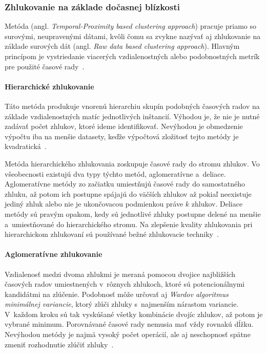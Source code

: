 \documentclass[a4paper,twoside,slovak,12pt,appendix]{article}
\begin{document}
\subsubsection{Zhlukovanie na základe dočasnej blízkosti}
Metóda (angl. \textit{Temporal-Proximity based clustering approach}) pracuje
priamo so surovými, neupravenými dátami, kvôli čomu sa zvykne nazývať aj
zhlukovanie na základe surových dát (angl. \textit{Raw data based clustering
approach}). Hlavným princípom je vystriedanie viacerých vzdialenostných alebo
podobnostných metrík pre použité časové rady~\cite{Rani2012}.

\paragraph{Hierarchické zhlukovanie}
\label{c:hierarchical-clustering}
Táto metóda produkuje vnorenú hierarchiu skupín podobných časových radov na
základe vzdialenostných matíc jednotlivých inštancií. Výhodou je, že nie je
nutné zadávať počet zhlukov, ktoré ideme identifikovať. Nevýhodou je obmedzenie
výpočtu iba na menšie datasety, keďže výpočtová zložitosť tejto metódy je
kvadratická~\cite{Dzeroski2007}.

Metóda hierarchického zhlukovania zoskupuje časové rady do stromu zhlukov. Vo
všeobecnosti existujú dva typy týchto metód, aglomeratívne a~deliace.
Aglomeratívne metódy zo začiatku umiestňujú časové rady do samostatného zhluku,
až potom ich postupne spájajú do väčších zhlukov až pokiaľ neexistuje jediný
zhluk alebo nie je ukončovacou podmienkou práve $k$ zhlukov. Deliace metódy sú
pravým opakom, kedy sú jednotlivé zhluky postupne delené na menšie
a~umiestňované do hierarchického stromu. Na zlepšenie kvality zhlukovania pri
hierarchickom zhlukovaní sú používané bežné zhlukovacie
techniky~\cite{WarrenLiao2005}.

\paragraph{Aglomeratívne zhlukovanie}
Vzdialenosť medzi dvoma zhlukmi je meraná pomocou dvojice najbližších časových
radov umiestnených v~rôznych zhlukoch, ktoré sú potencionálnymi kandidátmi na
zlúčenie. Podobnosť môže určovať aj
\textit{Wardov algoritmus minimálnej variancie}, ktorý zlúči zhluky
s~najmenším nárastom variancie. V~každom kroku sú tak vyskúšané všetky
kombinácie dvojíc zhlukov, až potom je vybrané minimum. Porovnávané časové rady
nemusia mať vždy rovnakú dĺžku. Nevýhodou metódy je najmä vysoký počet operácií,
ale aj neschopnosť spätne zmeniť rozhodnutie zlúčiť
zhluky~\cite{WarrenLiao2005}.
\end{document}
